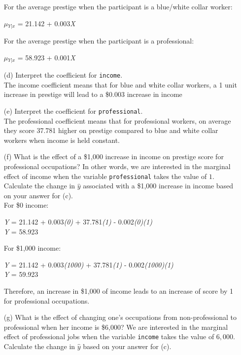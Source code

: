 \documentclass[12pt,letterpaper]{article}
\begin{document}
\begin{enumerate}
\noindent For the average prestige when the participant is a blue/white collar worker:

\begin{center}
	$\mu$$_{Y|x}$ = 21.142 + 0.003\textit{X}
\end{center}

\noindent For the average prestige when the participant is a professional:

\begin{center}
	$\mu$$_{Y|x}$ = 58.923 + 0.001\textit{X}
\end{center}	
\newpage
	\item [(d)]
	Interpret the coefficient for \texttt{income}. 
	\vspace{0.5cm} \\
	
	\noindent The income coefficient means that for blue and white collar workers, a 1 unit increase in prestige will lead to a \$0.003 increase in income
	
	\vspace{1cm}	
	\item [(e)]
	Interpret the coefficient for \texttt{professional}.
		\vspace{0.5cm} \\
	
	\noindent The professional coefficient means that for professional workers, on average they score 37.781 higher on prestige compared to blue and white collar workers when income is held constant.
	\newpage
	\item [(f)]
	What is the effect of a \$1,000 increase in income on prestige score for professional occupations? In other words, we are interested in the marginal effect of income when the variable \texttt{professional} takes the value of $1$. Calculate the change in $\hat{y}$ associated with a \$1,000 increase in income based on your answer for (c). \\
	\noindent For \$0 income:
	\begin{center}
		\textit{Y} = 21.142 + 0.003\textit{(0)} + 37.781\textit{(1)} - 0.002\textit{(0)}\textit{(1)} \\
		\textit{Y} = 58.923
	\end{center}
	
	\noindent For \$1,000 income:
	\begin{center}
		\textit{Y} = 21.142 + 0.003\textit{(1000)} + 37.781\textit{(1)} - 0.002\textit{(1000)}\textit{(1)} \\
		\textit{Y} = 59.923
	\end{center}
	\noindent Therefore, an increase in \$1,000 of income leads to an increase of score by 1 for professional occupations.
	\item [(g)]
	What is the effect of changing one's occupations from non-professional to professional when her income is \$6,000? We are interested in the marginal effect of professional jobs when the variable \texttt{income} takes the value of $6,000$. Calculate the change in $\hat{y}$ based on your answer for (c). \\
	

\end{enumerate}
\end{document}

